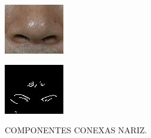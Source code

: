 \begin{figure}[h!]
    \caption{COMPONENTES CONEXAS NARIZ.}
    \centering
    \begin{minipage}[b]{0.45\textwidth}
        \centering
        \includegraphics[width=0.9\linewidth]{fig/02_detected_nose.png}
        \label{fig:nariz}
    \end{minipage}
    \hfill
    \begin{minipage}[b]{0.45\textwidth}
        \centering
        \includegraphics[width=0.9\linewidth]{fig/03_nose_edge.png}
        \label{fig:canny-nariz}
    \end{minipage}


\end{figure}
